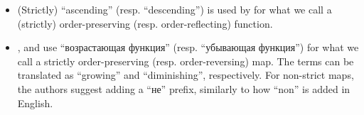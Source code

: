 \begin{remark}
\begin{itemize}
    \item (Strictly) \enquote{ascending} (resp. \enquote{descending}) is used by  for what we call a (strictly) order-preserving (resp. order-reflecting) function.

    \item {},  and  use \enquote{возрастающая функция} (resp. \enquote{убывающая функция}) for what we call a strictly order-preserving (resp. order-reversing) map. The terms can be translated as \enquote{growing} and \enquote{diminishing}, respectively. For non-strict maps, the authors suggest adding a \enquote{не} prefix, similarly to how \enquote{non} is added in English.
  \end{itemize}
\end{remark}

